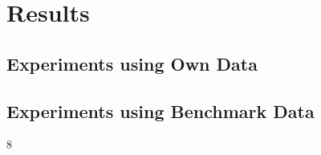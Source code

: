 \chapter{Results}
\label{chapter:results}

\graphicspath{ {report/Chapter6/assets/} } 

\section{Experiments using Own Data}

\section{Experiments using Benchmark Data}
8